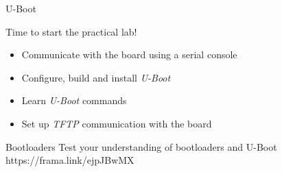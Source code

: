 \setuplabframe
{U-Boot}
{
  Time to start the practical lab!
  \begin{itemize}
  \item Communicate with the board using a serial console
  \item Configure, build and install {\em U-Boot}
  \item Learn {\em U-Boot} commands
  \item Set up {\em TFTP} communication with the board
  \end{itemize}
}

\quizframe
{Bootloaders}
{Test your understanding of bootloaders and U-Boot}
{https://frama.link/ejpJBwMX}

